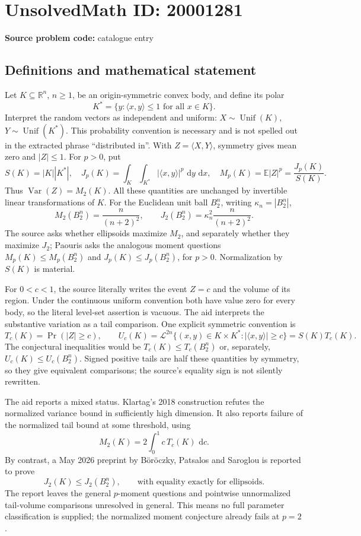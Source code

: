 \documentclass[11pt]{article}
\newcommand{\R}{\mathbb{R}}
\newcommand{\E}{\mathbb{E}}
\newcommand{\dd}{\,\mathrm{d}}
\begin{document}
\section*{UnsolvedMath ID: 20001281}
\textbf{Source problem code:} catalogue entry
\subsection{Definitions and mathematical statement}
Let \(K\subseteq\R^n\), \(n\geq1\), be an origin-symmetric convex body, and define its polar
\[
 K^*=\{y:\langle x,y\rangle\leq1\text{ for all }x\in K\}.
\]
Interpret the random vectors as independent and uniform: \(X\sim\operatorname{Unif}(K)\), \(Y\sim\operatorname{Unif}(K^*)\). This probability convention is necessary and is not spelled out in the extracted phrase ``distributed in''. With \(Z=\langle X,Y\rangle\), symmetry gives mean zero and \(|Z|\leq1\). For \(p>0\), put
\[
 S(K)=|K||K^*|,\quad
 J_p(K)=\int_K\int_{K^*}|\langle x,y\rangle|^p\,\dd y\,\dd x,
 \quad M_p(K)=\E|Z|^p=\frac{J_p(K)}{S(K)}.
\]
Thus \(\operatorname{Var}(Z)=M_2(K)\). All these quantities are unchanged by invertible linear transformations of \(K\). For the Euclidean unit ball \(B_2^n\), writing \(\kappa_n=|B_2^n|\),
\[
 M_2(B_2^n)=\frac{n}{(n+2)^2},\qquad
 J_2(B_2^n)=\kappa_n^2\frac{n}{(n+2)^2}.
\]
The source asks whether ellipsoids maximize \(M_2\), and separately whether they maximize \(J_2\); Paouris asks the analogous moment questions \(M_p(K)\leq M_p(B_2^n)\) and \(J_p(K)\leq J_p(B_2^n)\), for \(p>0\). Normalization by \(S(K)\) is material.

For \(0<c<1\), the source literally writes the event \(Z=c\) and the volume of its region. Under the continuous uniform convention both have value zero for every body, so the literal level-set assertion is vacuous. The aid interprets the substantive variation as a tail comparison. One explicit symmetric convention is
\[
 T_c(K)=\Pr(|Z|\geq c),\qquad
 U_c(K)=\mathcal L^{2n}\{(x,y)\in K\times K^*:|\langle x,y\rangle|\geq c\}=S(K)T_c(K).
\]
The conjectural inequalities would be \(T_c(K)\leq T_c(B_2^n)\) or, separately, \(U_c(K)\leq U_c(B_2^n)\). Signed positive tails are half these quantities by symmetry, so they give equivalent comparisons; the source's equality sign is not silently rewritten.

The aid reports a mixed status. Klartag's 2018 construction refutes the normalized variance bound in sufficiently high dimension. It also reports failure of the normalized tail bound at some threshold, using
\[
 M_2(K)=2\int_0^1c\,T_c(K)\,\dd c.
\]
By contrast, a May 2026 preprint by Böröczky, Patsalos and Saroglou is reported to prove
\[
 J_2(K)\leq J_2(B_2^n),\qquad
 \text{with equality exactly for ellipsoids}.
\]
The report leaves the general \(p\)-moment questions and pointwise unnormalized tail-volume comparisons unresolved in general. This means no full parameter classification is supplied; the normalized moment conjecture already fails at \(p=2\).
\end{document}
